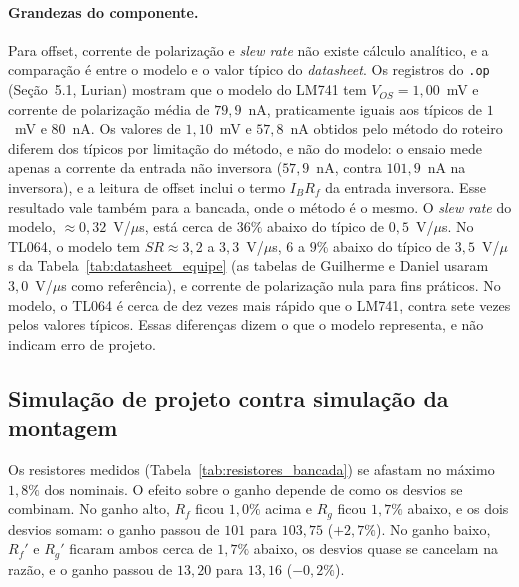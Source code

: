 \documentclass[11pt,a4paper]{article}
\begin{document}
\paragraph{Grandezas do componente.} Para offset, corrente de polarização e \textit{slew rate}
não existe cálculo analítico, e a comparação é entre o modelo e o valor típico do
\textit{datasheet}. Os registros do \texttt{.op} (Seção~5.1, Lurian) mostram que o modelo do LM741
tem $V_{OS}=1{,}00$~mV e corrente de polarização média de $79{,}9$~nA, praticamente iguais aos
típicos de $1$~mV e $80$~nA. Os valores de $1{,}10$~mV e $57{,}8$~nA obtidos pelo método do roteiro
diferem dos típicos por limitação do método, e não do modelo: o ensaio mede apenas a corrente da
entrada não inversora ($57{,}9$~nA, contra $101{,}9$~nA na inversora), e a leitura de offset inclui
o termo $I_BR_f$ da entrada inversora. Esse resultado vale também para a bancada, onde o método é o
mesmo. O \textit{slew rate} do modelo, $\approx0{,}32$~V/$\mu$s, está
cerca de $36\%$ abaixo do típico de $0{,}5$~V/$\mu$s. No TL064, o modelo tem $SR\approx3{,}2$ a
$3{,}3$~V/$\mu$s, $6$ a $9\%$ abaixo do típico de $3{,}5$~V/$\mu$s da Tabela~\ref{tab:datasheet_equipe}
(as tabelas de Guilherme e Daniel usaram $3{,}0$~V/$\mu$s como referência), e corrente de polarização nula
para fins práticos. No modelo, o TL064 é cerca de dez vezes mais rápido que o LM741, contra sete
vezes pelos valores típicos. Essas diferenças dizem o que o modelo representa, e não indicam erro
de projeto.

\subsection{Simulação de projeto contra simulação da montagem}

Os resistores medidos (Tabela~\ref{tab:resistores_bancada}) se afastam no máximo $1{,}8\%$ dos
nominais. O efeito sobre o ganho depende de como os desvios se combinam. No ganho alto, $R_f$ ficou
$1{,}0\%$ acima e $R_g$ ficou $1{,}7\%$ abaixo, e os dois desvios somam: o ganho passou de $101$
para $103{,}75$ ($+2{,}7\%$). No ganho baixo, $R_f'$ e $R_g'$ ficaram ambos cerca de $1{,}7\%$
abaixo, os desvios quase se cancelam na razão, e o ganho passou de $13{,}20$ para $13{,}16$
($-0{,}2\%$).
\end{document}
